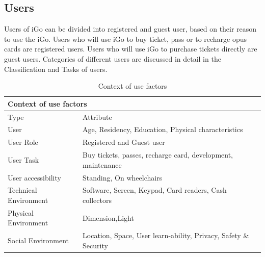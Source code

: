 \documentclass[a4paper, 11pt]{report}
\begin{document}
\subsection{Users}
Users of iGo can be divided into registered and guest user, based on their reason to use the iGo. Users who will use iGo to buy ticket, pass or to recharge opus cards are registered users. Users who will use iGo to purchase tickets directly are guest users. Categories of different users are discussed in detail in the Classification and Tasks of users.
\begin{table}[ht]
    \centering
    \begin{tabular}{|l|l|}
    \hline
     \hline
    \multicolumn{2}{|l|}{Context of use factors}\\
      \hline
       \hline
    Type & Attribute  \\
     \hline
     User & Age, Residency, Education, Physical characteristics \\
      \hline
     User Role & Registered and Guest user \\
     \hline
      User Task & Buy tickets, passes, recharge card, development, maintenance  \\
       \hline
        User accessibility & Standing, On wheelchairs  \\
        \hline
        Technical Environment & Software, Screen, Keypad, Card readers, Cash collectors\\
        \hline
             Physical Environment & Dimension,Light  \\
               \hline
               Social Environment & Location, Space, User learn-ability, Privacy, Safety \& Security  \\ 
                \hline
              
                  \hline
              
    \end{tabular}
    \caption{Context of use factors}
    \label{tab:user}
\end{table}
\end{document}
